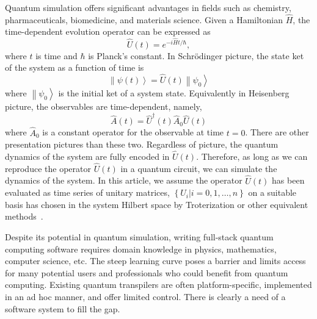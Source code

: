 \documentclass[a4paper,titlepage]{article}
\begin{document}
    Quantum simulation offers significant advantages in fields such as chemistry, pharmaceuticals,  biomedicine, and materials science.
    Given a Hamiltonian $\hat{H}$, the time-dependent evolution operator can be expressed as
    \begin{equation}
        \label{eq:hamiltonian}
        \hat{U}\left( t \right) = e^{-i\hat{H}t/\hbar},
    \end{equation}
    where $t$ is time and $\hbar$ is Planck's constant.
    In Schrödinger picture, the state ket of the system as a function of time is
    \begin{equation}
        \label{eq:sysstate}
        \left\| \psi\left( t \right) \right\rangle = \hat{U}\left( t \right)\left\| \psi_{0} \right\rangle
    \end{equation}
    where $\left\| \psi_{0} \right\rangle$ is the initial ket of a system state.
    Equivalently in Heisenberg picture, the observables are time-dependent, namely,
    \begin{equation}
        \label{eq:heisenberg}
        \hat{A} \left( t \right) = \hat{U}^{\dagger} \left( t \right) \hat{A}_{0} \hat{U} \left( t \right)
    \end{equation}
    where $\hat{A}_{0}$ is a constant operator for the observable at time $t=0$.
    There are other presentation pictures than these two.
    Regardless of picture, the quantum dynamics of the system are fully encoded in $\hat{U}\left( t \right)$.
    Therefore, as long as we can reproduce the operator $\hat{U}\left( t \right)$ in a quantum circuit, we can simulate the dynamics of the system.
    In this article, we assume the operator $\hat{U}\left( t \right)$ has been evaluated as time series of unitary matrices,
    $\left\{ U_{i} |i = 0, 1, \dots, n \right\}$ on a suitable basis has chosen in the system Hilbert space by Troterization
    or other equivalent methods~\cite{Suzuki1991,AbramsLloyd1999QPE,Lloyd1996,Chuang1997QPT}.


    Despite its potential in quantum simulation, writing full-stack quantum computing software requires domain knowledge
    in physics, mathematics, computer science, etc.
    The steep learning curve poses a barrier and limits access for many potential users and professionals
    who could benefit from quantum computing.
    Existing quantum transpilers are often platform-specific, implemented in an ad hoc manner,
    and offer limited control.
    There is clearly a need of a software system to fill the gap.
\end{document}
